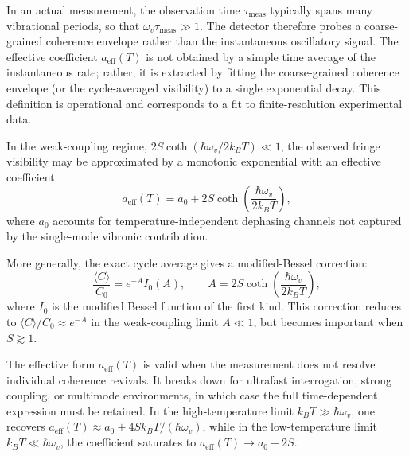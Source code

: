 \documentclass[aps,prl,twocolumn,showpacs,superscriptaddress,groupedaddress]{revtex4-2}
\begin{document}
In an actual measurement, the observation time \(\tau_{\mathrm{meas}}\) typically spans many vibrational periods, so that \(\omega_v \tau_{\mathrm{meas}}\gg 1\). The detector therefore probes a coarse-grained coherence envelope rather than the instantaneous oscillatory signal. The effective coefficient \(a_{\mathrm{eff}}(T)\) is not obtained by a simple time average of the instantaneous rate; rather, it is extracted by fitting the coarse-grained coherence envelope (or the cycle-averaged visibility) to a single exponential decay. This definition is operational and corresponds to a fit to finite-resolution experimental data.

In the weak-coupling regime, \(2S\coth(\hbar\omega_v/2k_B T)\ll 1\), the observed fringe visibility may be approximated by a monotonic exponential with an effective coefficient
\[
a_{\mathrm{eff}}(T)=a_0+2S\coth\!\left(\frac{\hbar\omega_v}{2k_B T}\right),
\]
where \(a_0\) accounts for temperature-independent dephasing channels not captured by the single-mode vibronic contribution.

More generally, the exact cycle average gives a modified-Bessel correction:
\[
\frac{\langle C\rangle}{C_0}=e^{-A}I_0(A),\qquad A=2S\coth\!\left(\frac{\hbar\omega_v}{2k_B T}\right),
\]
where \(I_0\) is the modified Bessel function of the first kind. This correction reduces to \(\langle C\rangle/C_0\approx e^{-A}\) in the weak-coupling limit \(A\ll 1\), but becomes important when \(S\gtrsim 1\).

The effective form \(a_{\mathrm{eff}}(T)\) is valid when the measurement does not resolve individual coherence revivals. It breaks down for ultrafast interrogation, strong coupling, or multimode environments, in which case the full time-dependent expression must be retained. In the high-temperature limit \(k_B T\gg \hbar\omega_v\), one recovers \(a_{\mathrm{eff}}(T)\approx a_0+4Sk_B T/(\hbar\omega_v)\), while in the low-temperature limit \(k_B T\ll \hbar\omega_v\), the coefficient saturates to \(a_{\mathrm{eff}}(T)\to a_0+2S\).
\end{document}
